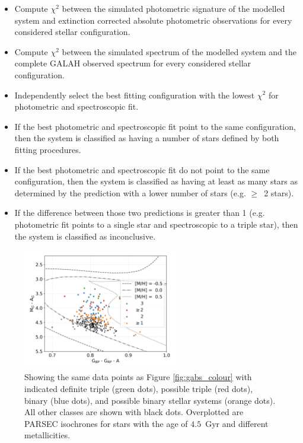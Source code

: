 \begin{itemize}
	\item Compute $\chi^2$ between the simulated photometric signature of the modelled system and extinction corrected absolute photometric observations for every considered stellar configuration. 
	\item Compute $\chi^2$ between the simulated spectrum of the modelled system and the complete GALAH observed spectrum for every considered stellar configuration. 
	\item Independently select the best fitting configuration with the lowest $\chi^2$ for photometric and spectroscopic fit.
	\item If the best photometric and spectroscopic fit point to the same configuration, then the system is classified as having a number of stars defined by both fitting procedures.
	\item If the best photometric and spectroscopic fit do not point to the same configuration, then the system is classified as having at least as many stars as determined by the prediction with a lower number of stars (e.g. $\geq$~2 stars).
	\item If the difference between those two predictions is greater than 1 (e.g. photometric fit points to a single star and spectroscopic to a triple star), then the system is classified as inconclusive. 
\end{itemize}

\begin{figure}
	\centering
	\includegraphics[width=0.6\textwidth]{mag_hr_gaia_bin-multi_iso_45Gyr_res_ebv_c3_07.png}
	\caption{Showing the same data points as Figure \ref{fig:gabs_colour} with indicated definite triple (green dots), possible triple (red dots), binary (blue dots), and possible binary stellar systems (orange dots). All other classes are shown with black dots. Overplotted are PARSEC isochrones \citep{2017ApJ...835...77M} for stars with the age of $4.5$~Gyr and different metallicities.}
	\label{fig:gabs_binmulti}
\end{figure}



